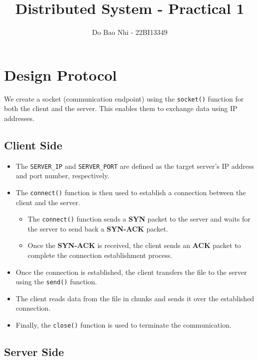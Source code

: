 \documentclass{article}
\title{Distributed System - Practical 1}
\author {Do Bao Nhi - 22BI13349}
\begin{document}
\maketitle

\tableofcontents
\listoffigures
\clearpage

\section{Design Protocol}

We create a socket (communication endpoint) using the \texttt{socket()} function for both the client and the server. This enables them to exchange data using IP addresses.

\subsection{Client Side}

\begin{itemize}
    \item The \texttt{SERVER\_IP} and \texttt{SERVER\_PORT} are defined as the target server's IP address and port number, respectively.
    \item The \texttt{connect()} function is then used to establish a connection between the client and the server.
    \begin{itemize}
        \item The \texttt{connect()} function sends a \textbf{SYN} packet to the server and waits for the server to send back a \textbf{SYN-ACK} packet.
        \item Once the \textbf{SYN-ACK} is received, the client sends an \textbf{ACK} packet to complete the connection establishment process.
    \end{itemize}
    \item Once the connection is established, the client transfers the file to the server using the \texttt{send()} function.
    \item The client reads data from the file in chunks and sends it over the established connection.
    \item Finally, the \texttt{close()} function is used to terminate the communication.
\end{itemize}

\subsection{Server Side}
\end{document}
